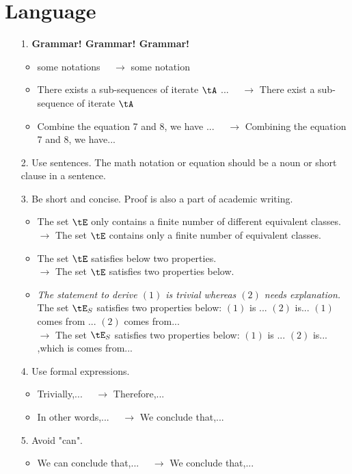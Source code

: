 \documentclass[11pt]{article}
\begin{document}
\section{Language}
\begin{enumerate}
    \item[1.] \textbf{Grammar! Grammar! Grammar!} 
    \begin{itemize}
        \item some notations $\quad \rightarrow$ some notation
        \item There exists a sub-sequences of iterate $\tA$ ...  $\quad \rightarrow$ There exist a sub-sequence of iterate $\tA$
        \item Combine the equation 7 and 8, we have ... $\quad \rightarrow$ Combining the equation 7 and 8, we have...
    \end{itemize}
    \item[2.] Use sentences. The math notation or equation should be a noun or short clause in a sentence.
    \item[3.] Be short and concise. Proof is also a part of academic writing.
    \begin{itemize}
        \item The set $\tE$ only contains a finite number of different equivalent classes. \\$ \rightarrow$  The set $\tE$ contains only a finite number of equivalent classes. 
        \item The set $\tE$ satisfies below two properties. \\
        $ \rightarrow$ The set $\tE$ satisfies two properties below.
        \item \textit{The statement to derive $(1)$ is trivial whereas $(2)$ needs explanation.}\\
        The set $\tE_{S}$ satisfies two properties below: $(1)$ is ... $(2)$ is... $(1)$ comes from ... $(2)$ comes from...\\
        $\rightarrow$ The set $\tE_{S}$ satisfies two properties below: $(1)$ is ... $(2)$ is... ,which is comes from...
    \end{itemize}
    \item[4.] Use formal expressions. 
    \begin{itemize}
        \item Trivially,... $\quad \rightarrow $ Therefore,...
        \item In other words,...  $\quad \rightarrow $ We conclude that,...
    \end{itemize}
    \item[5.] Avoid "can". 
    \begin{itemize}
        \item We can conclude that,...  $\quad \rightarrow $ We conclude that,...
    \end{itemize}
\end{enumerate}
\end{document}
